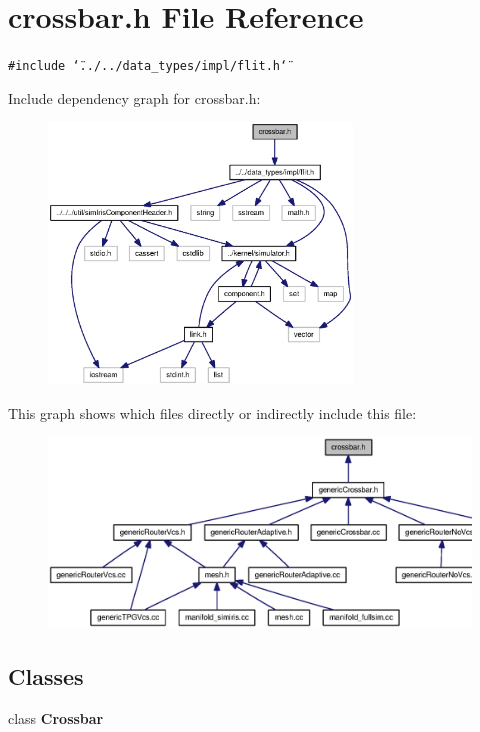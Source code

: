 \section{crossbar.h File Reference}
\label{crossbar_8h}
{\tt \#include \char`\"{}../../data\_\-types/impl/flit.h\char`\"{}}\par


Include dependency graph for crossbar.h:\nopagebreak
\begin{figure}[H]
\begin{center}
\leavevmode
\includegraphics[width=229pt]{crossbar_8h__incl}
\end{center}
\end{figure}


This graph shows which files directly or indirectly include this file:\nopagebreak
\begin{figure}[H]
\begin{center}
\leavevmode
\includegraphics[width=369pt]{crossbar_8h__dep__incl}
\end{center}
\end{figure}
\subsection*{Classes}
\begin{CompactItemize}
\item 
class {\bf Crossbar}
\end{CompactItemize}

